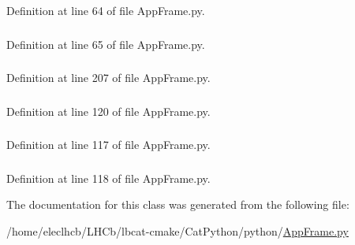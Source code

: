 Definition at line 64 of file AppFrame.py.\hypertarget{classAppFrame_1_1AppFrame_aa6410672f90bddc15b60bddd6040c65b}{
\subsubsection[{TB\_\-LOG}]{}}
\label{classAppFrame_1_1AppFrame_aa6410672f90bddc15b60bddd6040c65b}


Definition at line 65 of file AppFrame.py.\hypertarget{classAppFrame_1_1AppFrame_a2fd6329df31bbd37f1239f34a567d71a}{
\subsubsection[{toolBar}]{}}
\label{classAppFrame_1_1AppFrame_a2fd6329df31bbd37f1239f34a567d71a}


Definition at line 207 of file AppFrame.py.\hypertarget{classAppFrame_1_1AppFrame_a1c088e6a3fc661ea80a336100160af9a}{
\subsubsection[{tree}]{}}
\label{classAppFrame_1_1AppFrame_a1c088e6a3fc661ea80a336100160af9a}


Definition at line 120 of file AppFrame.py.\hypertarget{classAppFrame_1_1AppFrame_af5e0f9082a6580c786ad0a801dd31685}{
\subsubsection[{treeContainer}]{}}
\label{classAppFrame_1_1AppFrame_af5e0f9082a6580c786ad0a801dd31685}


Definition at line 117 of file AppFrame.py.\hypertarget{classAppFrame_1_1AppFrame_ae267f6f9741bde298362f95ac19c97f2}{
\subsubsection[{vbox}]{}}
\label{classAppFrame_1_1AppFrame_ae267f6f9741bde298362f95ac19c97f2}


Definition at line 118 of file AppFrame.py.

The documentation for this class was generated from the following file:\begin{DoxyCompactItemize}
\item 
/home/eleclhcb/LHCb/lbcat-\/cmake/CatPython/python/\hyperlink{AppFrame_8py}{AppFrame.py}\end{DoxyCompactItemize}
